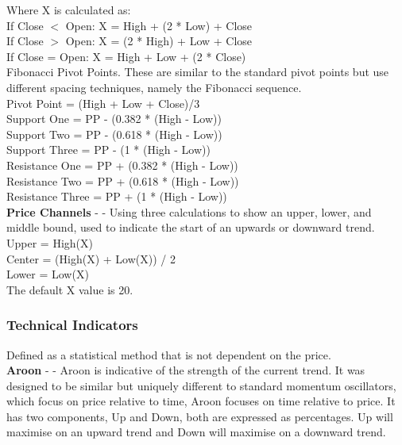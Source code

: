\documentclass[conference]{IEEEtran}
\begin{document}
\noindent
Where X is calculated as: \\
If Close $<$ Open: X = High + (2 * Low) + Close\\
If Close $>$ Open: X = (2 * High) + Low + Close\\
If Close = Open: X = High + Low + (2 * Close)\\

\noindent
Fibonacci Pivot Points. These are similar to the standard pivot points but use different spacing techniques, namely the Fibonacci sequence.\\
Pivot Point = (High + Low + Close)/3\\
Support One = PP - (0.382 * (High  -  Low))\\
Support Two = PP - (0.618 * (High  -  Low))\\
Support Three = PP - (1 * (High  -  Low))\\
Resistance One = PP + (0.382 * (High  -  Low))\\
Resistance Two = PP + (0.618 * (High  -  Low))\\
Resistance Three = PP + (1 * (High  -  Low))\\

\noindent
\textbf{Price Channels} - \cite{Murphy1999} - Using three calculations to show an upper, lower, and middle bound, used to indicate the start of an upwards or downward trend.\\

\noindent
Upper = High(X)\\
Center = (High(X) + Low(X)) / 2\\
Lower = Low(X)\\
The default X value is 20.\\

\subsubsection{Technical Indicators} Defined as a statistical method that is not dependent on the price. \\

\textbf{Aroon} - \cite{Chande1994} - Aroon is indicative of the strength of the current trend. It was designed to be similar but uniquely different to standard momentum oscillators, which focus on price relative to time, Aroon focuses on time relative to price. It has two components, Up and Down, both are expressed as percentages. Up will maximise on an upward trend and Down will maximise on a downward trend.\\
\end{document}
